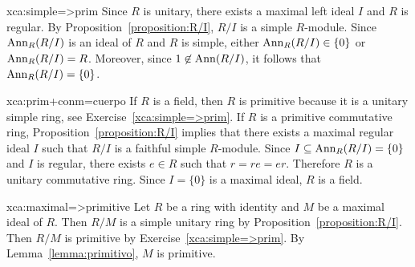 \begin{sol}{xca:simple=>prim} 
	Since $R$ is unitary, there exists a maximal left ideal $I$ and $R$ is regular.
	By Proposition~\ref{proposition:R/I}, $R/I$ is a simple $R$-module. 
	Since $\operatorname{Ann}_R(R/I)$ is an ideal of $R$ and $R$ is simple, either $\operatorname{Ann}_R(R/I)\in\{0\}$ or 
	$\operatorname{Ann}_R(R/I)=R$. Moreover, since 
	$1\not\in\operatorname{Ann}(R/I)$, it follows that 
	$\operatorname{Ann}_R(R/I)=\{0\}$. 
\end{sol}

\begin{sol}{xca:prim+conm=cuerpo}
	If $R$ is a field, then $R$ is primitive because it is a unitary simple ring, see  
	Exercise~\ref{xca:simple=>prim}. If $R$ is a primitive commutative ring, Proposition~\ref{proposition:R/I} implies that there exists a maximal regular ideal $I$
	such that  
	$R/I$ is a faithful simple $R$-module. 
	Since $I\subseteq \operatorname{Ann}_R(R/I)=\{0\}$ and $I$ is regular, there exists $e\in R$ such that 
	$r=re=er$. Therefore $R$ is a unitary commutative ring. Since $I=\{0\}$ is a maximal ideal, 
	$R$ is a field. 
\end{sol}

\begin{sol}{xca:maximal=>primitive}
	Let $R$ be a ring with identity and $M$ be a maximal ideal of $R$. Then 
	$R/M$ is a simple unitary ring by 
	Proposition~\ref{proposition:R/I}. Then $R/M$ is primitive by
	Exercise~\ref{xca:simple=>prim}. By Lemma~\ref{lemma:primitivo}, 
	$M$ is primitive. 
\end{sol}




    

